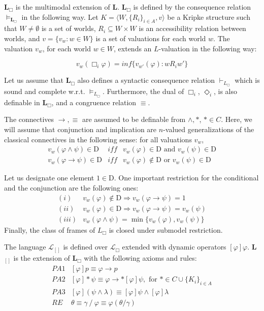 \documentclass[paper=a4, fontsize=11pt]{scrartcl} %
\numberwithin{equation}{section} %
\numberwithin{figure}{section} %
\numberwithin{table}{section} %
\begin{document}
\begin{definition}
    \textbf{L}$_{\Box}$ is the multimodal extension of \textbf{L}. \textbf{L}$_{\Box}$ is defined by the consequence relation $\vDash_{\textbf{L}_\Box}$ in the following way. Let $K = \langle W, \{R_i\}_{i \in A}, v\rangle$ be a Kripke structure such that $W \neq \emptyset$ is a set of worlds, $R_i \subseteq W \times W$ is an accessibility relation between worlds, and $v = \{v_w:w \in W\}$ is a set of valuations for each world $w$. The valuation $v_w$, for each world $w \in W$, extends an $L$-valuation in the following way: 

    \[v_w(\Box_i\varphi) = inf\{v_{w'}(\varphi): wR_iw'\}\]
\end{definition}

Let us assume that \textbf{L}$_\Box$ also defines a syntactic consequence relation $\vdash_{L_\Box}$ which is sound and complete w.r.t. $\vDash_{L_\Box}$. Furthermore, the dual of $\Box_i$, $\Diamond_i$, is also definable in \textbf{L}$_\Box$, and a congruence relation $\equiv$. 

The connectives $\rightarrow, \equiv$ are assumed to be definable from $\land, *$, $* \in C$. Here, we will assume that conjunction and implication are $n$-valued generalizations of the classical connectives in the following sense: for all valuations $v_w$,
\[
\begin{array}{lll}
   v_w(\varphi \land \psi) \in \mathrm{D}  &  iff &v_w(\varphi) \in \mathrm{D} \text{ and } v_w(\psi) \in \mathrm{D}\\
    v_w(\varphi \rightarrow \psi) \in \mathrm{D} &  iff &  v_w(\varphi) \notin \mathrm{D} \text{ or } v_w(\psi) \in \mathrm{D}
\end{array}\]

Let us designate one element $1 \in \mathrm{D}$. One important restriction for the conditional and the conjunction are the following ones:
\[
\begin{array}{ll}
    (i) & v_w(\varphi) \notin \mathrm{D} \Rightarrow v_w(\varphi \rightarrow \psi) = 1 \\
    (ii) & v_w(\varphi) \in \mathrm{D} \Rightarrow v_w(\varphi \rightarrow \psi) = v_w(\psi)\\
    (iii) & v_w(\varphi \land \psi) = \min\{v_w(\varphi), v_w(\psi)\}
\end{array}
\]
Finally, the class of frames of $L_\Box$ is closed under submodel restriction. 

The language $\mathcal{L}_{[]}$ is defined over $\mathcal{L}_\Box$ extended with dynamic operators $[\varphi]\varphi$. \textbf{L}$_{[]}$ is the extension of \textbf{L}$_\Box$ with the following axioms and rules:
\[
\begin{array}{ll}
    PA1 & [\varphi]p \equiv \varphi \rightarrow p \\
    PA2 &  [\varphi]*\psi \equiv \varphi \rightarrow *[\varphi]\psi, \text{ for }* \in C \cup \{K_i\}_{i \in A}\\
    PA3 & [\varphi](\psi \land \lambda) \equiv [\varphi]\psi \land [\varphi]\lambda
    \\ RE & \theta \equiv \gamma\ /\ \varphi \equiv \varphi(\theta/\gamma)  
\end{array}
\]
\end{document}
